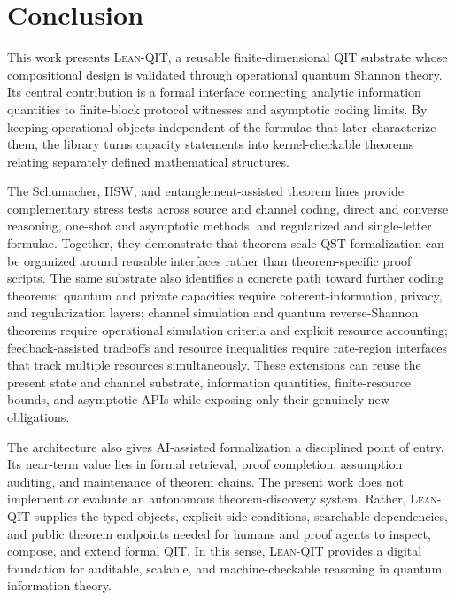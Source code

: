 \documentclass[10pt,a4paper]{article}
\DeclareRobustCommand{\LeanQIT}{\textnormal{\textsc{Lean-QIT}}}
\begin{document}
	\section{Conclusion}
	\label{sec:conclusion}
	
This work presents \LeanQIT{}, a reusable finite-dimensional QIT substrate whose compositional design is validated through operational quantum Shannon theory. Its central contribution is a formal interface connecting analytic information quantities to finite-block protocol witnesses and asymptotic coding limits. By keeping operational objects independent of the formulae that later characterize them, the library turns capacity statements into kernel-checkable theorems relating separately defined mathematical structures.

The Schumacher, HSW, and entanglement-assisted theorem lines provide complementary stress tests across source and channel coding, direct and converse reasoning, one-shot and asymptotic methods, and regularized and single-letter formulae. Together, they demonstrate that theorem-scale QST formalization can be organized around reusable interfaces rather than theorem-specific proof scripts. The same substrate also identifies a concrete path toward further coding theorems: quantum and private capacities require coherent-information, privacy, and regularization layers; channel simulation and quantum reverse-Shannon theorems require operational simulation criteria and explicit resource accounting; feedback-assisted tradeoffs and resource inequalities require
rate-region interfaces that track multiple resources simultaneously. These extensions can reuse the present state and channel substrate, information quantities, finite-resource bounds, and asymptotic APIs while exposing only their genuinely new obligations.

The architecture also gives AI-assisted formalization a disciplined point of entry. Its near-term value lies in formal retrieval, proof completion, assumption auditing, and maintenance of theorem chains. The present work does not implement or evaluate an autonomous theorem-discovery system. Rather, \LeanQIT{} supplies the typed objects, explicit side conditions, searchable dependencies, and public theorem endpoints needed for humans and proof agents to inspect, compose, and extend formal QIT. In this sense, \LeanQIT{} provides a digital foundation for auditable, scalable, and machine-checkable reasoning in quantum information theory.
\end{document}

